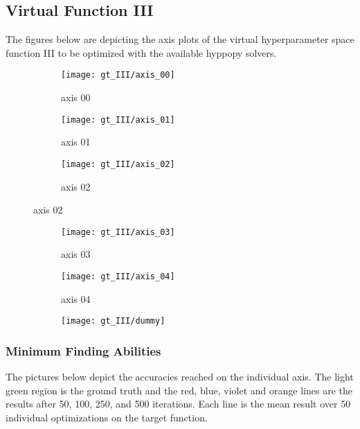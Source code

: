 \subsection{Virtual Function III}
The figures below are depicting the axis plots of the virtual hyperparameter space function III to be optimized with the available hyppopy solvers. 
\begin{figure}[h]
	\begin{subfigure}{0.32\textwidth}
		\texttt{[image: gt\_III/axis\_00]} 
		\caption{axis 00}
		\label{fig:axis00_III}
	\end{subfigure}
	\begin{subfigure}{0.32\textwidth}
		\texttt{[image: gt\_III/axis\_01]}
		\caption{axis 01}
		\label{fig:axis01_III}
	\end{subfigure}
	\begin{subfigure}{0.32\textwidth}
		\texttt{[image: gt\_III/axis\_02]}
		\caption{axis 02}
		\label{fig:axis02_III}
	\end{subfigure}
\end{figure}

\begin{figure}[h]
	\begin{subfigure}{0.32\textwidth}
		\texttt{[image: gt\_III/axis\_03]} 
		\caption{axis 03}
		\label{fig:axis03_III}
	\end{subfigure}
	\begin{subfigure}{0.32\textwidth}
		\texttt{[image: gt\_III/axis\_04]}
		\caption{axis 04}
		\label{fig:axis04_III}
	\end{subfigure}
	\begin{subfigure}{0.32\textwidth}
		\texttt{[image: gt\_III/dummy]}
		\caption{}
		\label{fig:dummy1_III}
	\end{subfigure}
\end{figure}


\newpage


\subsubsection{Minimum Finding Abilities}

The pictures below depict the accuracies reached on the individual axis. The light green region is the ground truth and the red, blue, violet and orange lines are the results after 50, 100, 250, and 500 iterations. Each line is the mean result over 50 individual optimizations on the target function.

